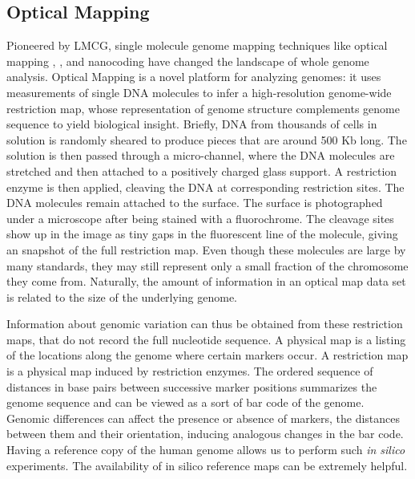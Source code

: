 \subsection*{Optical Mapping}
Pioneered by LMCG, single molecule genome mapping techniques like optical mapping \cite{Schwartz_etal_1993_Science}, \cite{Dimalanta_etal_2004_AnalChem}, and nanocoding \cite{Jo_etal_2007_PNAS} have changed the landscape of whole genome analysis. Optical Mapping is a novel platform for analyzing genomes: it uses measurements of single DNA molecules to infer a high-resolution genome-wide restriction map, whose representation of genome structure complements genome sequence to yield biological insight. Briefly, DNA from thousands of cells in solution is randomly sheared to produce pieces that are around 500 Kb long. The solution is then passed through a micro-channel, where the DNA molecules are stretched and then attached to a positively charged glass support. A restriction enzyme is then applied, cleaving the DNA at corresponding restriction sites. The DNA molecules remain attached to the surface. The surface is photographed under a microscope after being stained with a fluorochrome. The cleavage sites show up in the image as tiny gaps in the fluorescent line of the molecule, giving an snapshot of the full restriction map. Even though these molecules are large by many standards, they may still represent only a small fraction of the chromosome they come from. Naturally, the amount of information in an optical map data set is related to the size of the underlying genome. 

Information about genomic variation can thus be obtained from these restriction maps, that do not record the full nucleotide sequence. A physical map is a listing of the locations along the genome where certain markers occur. A restriction map is a physical map induced by restriction enzymes. The ordered sequence of distances in base pairs between successive marker positions summarizes the genome sequence and can be viewed as a sort of bar code of the genome. Genomic differences can affect the presence or absence of markers, the distances between them and their orientation, inducing analogous changes in the bar code. Having a reference copy of the human genome allows us to perform such {\emph{in silico}} experiments. The availability of in silico reference maps can be extremely helpful.

